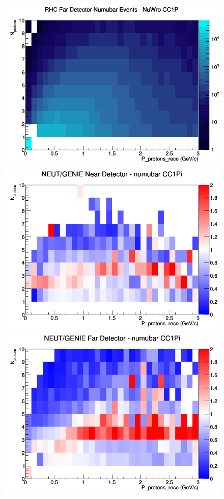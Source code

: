\begin{figure}[h]
\endminipage
{}
\includegraphics[width=\linewidth]{eff_N_P/FGT/protons/CC1Pi_RHC_FD_numubar_N_P_NuWro.png}
\endminipage
\newline
{}
\includegraphics[width=\linewidth]{eff_N_P/FGT/protons/ratios/CC1Pi_NEUT_GENIE_numubar_near_N_P.png}
\endminipage
{}
\includegraphics[width=\linewidth]{eff_N_P/FGT/protons/ratios/CC1Pi_NEUT_GENIE_numubar_far_N_P.png}

\end{figure}
